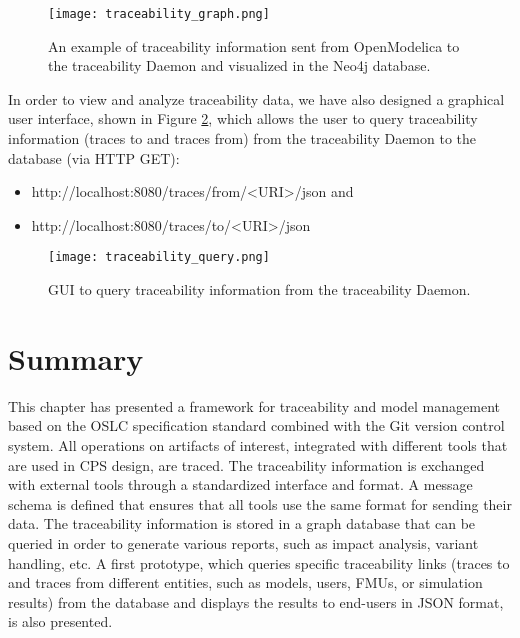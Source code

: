 \begin{landscape}
\begin{figure}
	\texttt{[image: traceability\_graph.png]}
	\caption{An example of traceability information sent from OpenModelica to the traceability Daemon and visualized in the Neo4j database.}
	\label{fig:traceabilitygraph}
\end{figure}
\end{landscape}

In order to view and analyze traceability data, we have also designed a graphical user interface, shown in
Figure \ref{fig:traceabilityquery}, which allows the user to query traceability information (traces to and traces from) from the traceability
Daemon to the database (via HTTP GET):

\begin{itemize}
\item http://localhost:8080/traces/from/<URI>/json and
\item http://localhost:8080/traces/to/<URI>/json 

\end{itemize}

\begin{figure} [!h]
	\texttt{[image: traceability\_query.png]}
	\caption{GUI to query traceability information from the traceability Daemon.}
	\label{fig:traceabilityquery}
\end{figure}
 
\section{Summary}
\label{sec:traceabilitysummary}

This chapter has presented a framework for traceability and model management based on the OSLC specification standard combined with the Git version control system. All operations on artifacts of interest, integrated with different tools that are used in CPS design, are traced. The traceability information is exchanged with external tools through a standardized interface and format. A message schema is defined that ensures that all tools use the same format for sending their data. The traceability information is stored in a graph database that can be queried in order to generate various reports, such as impact analysis, variant handling, etc. A first prototype, which queries specific traceability links (traces to and traces from different entities, such as models, users, FMUs, or simulation results) from the database and displays the results to end-users in JSON format, is also presented. 

